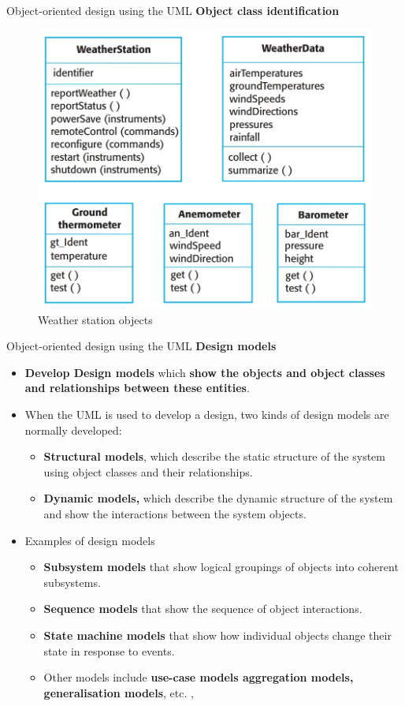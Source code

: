 \documentclass{beamer}
\begin{document}
\begin{frame}{Object-oriented design using the UML}
	\textbf{Object class identification}
	\begin{figure}
		\includegraphics[scale=.4]{img/m3_6}
		\caption{Weather station objects}
	\end{figure}
\end{frame}
\begin{frame}{Object-oriented design using the UML}
	\textbf{Design models}
\begin{itemize}
	\item \textbf{Develop Design models} which \textbf{show the objects and object classes and relationships between these entities}. 
	\item When the UML is used to develop a design, two kinds of design models are normally 
	developed:

	\begin{itemize}
		\item \textbf{Structural models}, which describe the static structure of the system using object classes 
		and their relationships.
		\item \textbf{Dynamic models,} which describe the dynamic structure of the system and show the 
		interactions between the system objects.
		
	\end{itemize}
\item Examples of design models
\begin{itemize}
	\item \textbf{Subsystem models} that show logical groupings of 
	objects into coherent subsystems.
	\item \textbf{Sequence models} that show the sequence of object 
	interactions.
	\item \textbf{State machine models} that show how individual objects 
	change their state in response to events.
	\item Other models include \textbf{use-case models aggregation 
		models, generalisation models}, etc. ,
\end{itemize}
\end{itemize}
\end{frame}
\end{document}
